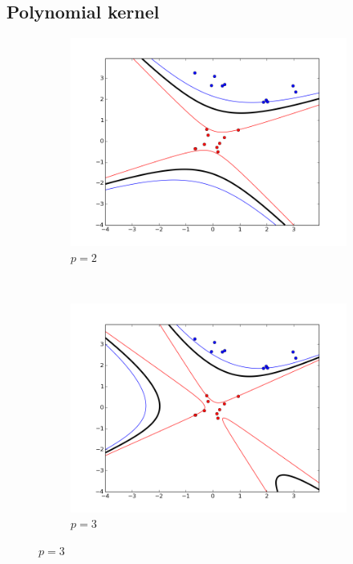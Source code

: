 \documentclass{article}
\begin{document}
\newpage
\subsection{Polynomial kernel}
\begin{figure}[!h]
    \centering
    \begin{subfigure}[b]{0.3\textwidth}
        \includegraphics[width=1.2\textwidth]{images/pol/1/figure_2.png}
        \caption{$p = 2$} \label{polynomial_1_figure_1}
    \end{subfigure}
    ~ 
    \begin{subfigure}[b]{0.3\textwidth}
        \includegraphics[width=1.2\textwidth]{images/pol/1/figure_3.png}
        \caption{$p = 3$}  \label{polynomial_1_figure_2}

\end{subfigure}
\end{figure}
\end{document}
